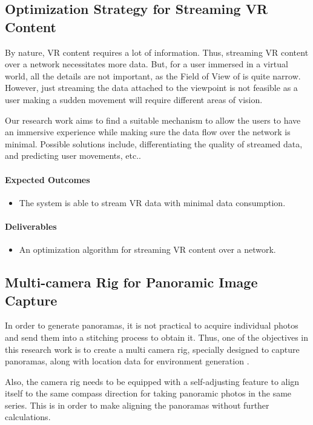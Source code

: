 \subsection{Optimization Strategy for Streaming VR Content}
\label{intro_subsec:3_5}

By nature, VR content requires a lot of information. Thus, streaming VR content over a network necessitates more data. But, for a user immersed in a virtual world, all the details are not important, as the Field of View of is quite narrow. However, just streaming the data attached to the viewpoint is not feasible as a user making a sudden movement will require different areas of vision.

Our research work aims to find a suitable mechanism to allow the users to have an immersive experience while making sure the data flow over the network is minimal. Possible solutions include, differentiating the quality of streamed data, and predicting user movements, etc..

\paragraph{Expected Outcomes}
\begin{itemize}
\item{The system is able to stream VR data with minimal data consumption.}
\end{itemize}

\paragraph{Deliverables}
\begin{itemize}
\item{An optimization algorithm for streaming VR content over a network.}
\end{itemize}

\subsection{Multi-camera Rig for Panoramic Image Capture}
\label{intro_subsec:3_6}

In order to generate panoramas, it is not practical to acquire individual photos and send them into a stitching process to obtain it. Thus, one of the objectives in this research work is to create a multi camera rig, specially designed to capture panoramas, along with location data for environment generation \cite{18}. 

Also, the camera rig needs to be equipped with a self-adjusting feature to align itself to the same compass direction for taking panoramic photos in the same series. This is in order to make aligning the panoramas without further calculations.

